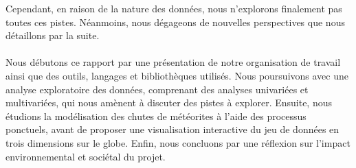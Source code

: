 \documentclass[12pt]{article}
\begin{document}
Cependant, en raison de la nature des données, nous n'explorons finalement pas toutes ces pistes. Néanmoins, nous dégageons de nouvelles perspectives que nous détaillons par la suite.\\
\\
Nous débutons ce rapport par une présentation de notre organisation de travail ainsi que des outils, langages et bibliothèques utilisés. Nous poursuivons avec une analyse exploratoire des données, comprenant des analyses univariées et multivariées, qui nous amènent à discuter des pistes à explorer. Ensuite, nous étudions la modélisation des chutes de météorites à l'aide des processus ponctuels, avant de proposer une visualisation interactive du jeu de données en trois dimensions sur le globe. Enfin, nous concluons par une réflexion sur l'impact environnemental et sociétal du projet.\\
\newpage
\end{document}
